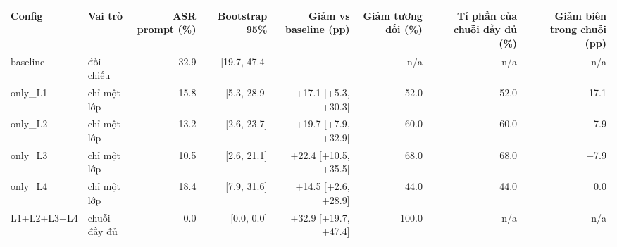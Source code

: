 \begin{tabular}{llrrrrrr}
\toprule
Config & Vai trò & ASR prompt (\%) & Bootstrap 95\% & Giảm vs baseline (pp) & Giảm tương đối (\%) & Tỉ phần của chuỗi đầy đủ (\%) & Giảm biên trong chuỗi (pp) \\
\midrule
baseline & đối chiếu & 32.9 & [19.7, 47.4] & - & n/a & n/a & n/a \\
only\_L1 & chỉ một lớp & 15.8 & [5.3, 28.9] & +17.1 [+5.3, +30.3] & 52.0 & 52.0 & +17.1 \\
only\_L2 & chỉ một lớp & 13.2 & [2.6, 23.7] & +19.7 [+7.9, +32.9] & 60.0 & 60.0 & +7.9 \\
only\_L3 & chỉ một lớp & 10.5 & [2.6, 21.1] & +22.4 [+10.5, +35.5] & 68.0 & 68.0 & +7.9 \\
only\_L4 & chỉ một lớp & 18.4 & [7.9, 31.6] & +14.5 [+2.6, +28.9] & 44.0 & 44.0 & 0.0 \\
L1+L2+L3+L4 & chuỗi đầy đủ & 0.0 & [0.0, 0.0] & +32.9 [+19.7, +47.4] & 100.0 & n/a & n/a \\
\bottomrule
\end{tabular}
